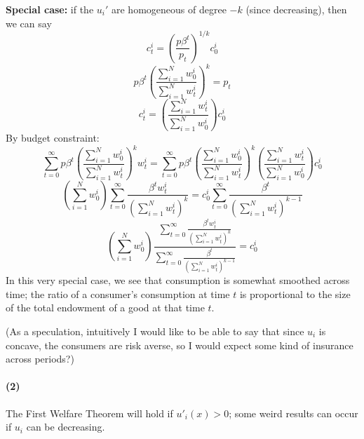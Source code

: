\documentclass[10pt,letter]{article}
\newcommand{\problempart}[1]{\paragraph{#1}}
\begin{document}
\textbf{Special case:} if the $u_i'$ are homogeneous of degree $-k$ (since decreasing), then we can say
\[ c^i_t = \left(\frac{p\beta^t}{p_t} \right)^{1/k} c^i_0 \]
\[ p\beta^t\left(\frac{\sum_{i=1}^N w^i_0}{\sum_{i=1}^N w^i_t}\right)^k = p_t \]
\[ c^i_t = \left(\frac{\sum_{i=1}^N w^i_t}{\sum_{i=1}^N w^i_0}\right) c^i_0 \]
By budget constraint:
\[ \sum_{t=0}^\infty p\beta^t\left(\frac{\sum_{i=1}^N w^i_0}{\sum_{i=1}^N w^i_t}\right)^k w^i_t = \sum_{t=0}^\infty p\beta^t\left(\frac{\sum_{i=1}^N w^i_0}{\sum_{i=1}^N w^i_t}\right)^k \left(\frac{\sum_{i=1}^N w^i_t}{\sum_{i=1}^N w^i_0}\right) c^i_0  \]
\[ \left( \sum_{i=1}^N w^i_0\right) \sum_{t=0}^\infty \frac{\beta^tw^i_t}{\left(\sum_{i=1}^N w^i_t\right)^k}  = c^i_0 \sum_{t=0}^\infty \frac{\beta^t}{\left(\sum_{i=1}^N w^i_t\right)^{k-1}}   \]
\[ \left( \sum_{i=1}^N w^i_0\right) \frac{\sum_{t=0}^\infty \frac{\beta^tw^i_t}{\left(\sum_{i=1}^N w^i_t\right)^k}}{\sum_{t=0}^\infty \frac{\beta^t}{\left(\sum_{i=1}^N w^i_t\right)^{k-1}} }  = c^i_0   \]
In this very special case, we see that consumption is somewhat smoothed across time; the ratio of a consumer's consumption at time $t$ is proportional to the size of the total endowment of a good at that time $t$.

(As a speculation, intuitively I would like to be able to say that since $u_i$ is concave, the consumers are risk averse, so I would expect some kind of insurance across periods?)
\problempart{(2)}
The First Welfare Theorem will hold if $u'_i(x) > 0$; some weird results can occur if $u_i$ can be decreasing.
\end{document}
